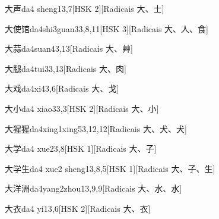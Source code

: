 \begin{entry}{大声}{da4 sheng1}{3,7}[HSK 2][Radicais ⼤、⼠]
\end{entry}

\begin{entry}{大使馆}{da4shi3guan3}{3,8,11}[HSK 3][Radicais ⼤、⼈、⾷]
\end{entry}

\begin{entry}{大蒜}{da4suan4}{3,13}[Radicais ⼤、⾋]
\end{entry}

\begin{entry}{大腿}{da4tui3}{3,13}[Radicais ⼤、⾁]
\end{entry}

\begin{entry}{大戏}{da4xi4}{3,6}[Radicais ⼤、⼽]
\end{entry}

\begin{entry}{大小}{da4 xiao3}{3,3}[HSK 2][Radicais ⼤、⼩]
\end{entry}

\begin{entry}{大猩猩}{da4xing1xing5}{3,12,12}[Radicais ⼤、⽝、⽝]
\end{entry}

\begin{entry}{大学}{da4 xue2}{3,8}[HSK 1][Radicais ⼤、⼦]
\end{entry}

\begin{entry}{大学生}{da4 xue2 sheng1}{3,8,5}[HSK 1][Radicais ⼤、⼦、⽣]
\end{entry}

\begin{entry}{大洋洲}{da4yang2zhou1}{3,9,9}[Radicais ⼤、⽔、⽔]
\end{entry}

\begin{entry}{大衣}{da4 yi1}{3,6}[HSK 2][Radicais ⼤、⾐]
\end{entry}

